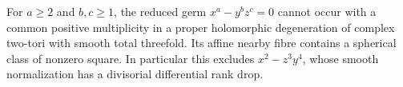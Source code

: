 \begin{proposition}\hypertarget{tag-02WP}{}\label{night:P4.18}\label{stmt:P4.18}

For $a\geq2$ and $b,c\geq1$, the reduced germ
$x^a-y^bz^c=0$ cannot occur with a common positive multiplicity
in a proper holomorphic degeneration of complex two-tori with
smooth total threefold. Its affine
nearby fibre contains a spherical class of nonzero square.
In particular this excludes $x^2-z^3y^4$, whose smooth
normalization has a divisorial differential rank drop.
\end{proposition}
